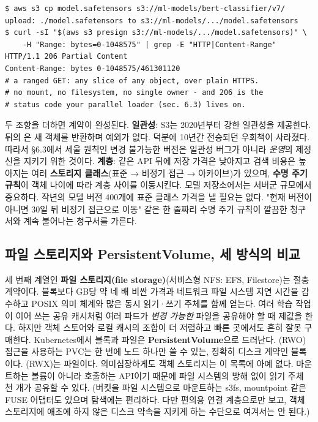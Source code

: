 \begin{terminalbox}
\begin{Verbatim}[breaklines=true,breakanywhere=true,fontsize=\small,formatcom=\color{tbbtermfg},codes=\tbbcodeactive]
$ aws s3 cp model.safetensors s3://ml-models/bert-classifier/v7/
upload: ./model.safetensors to s3://ml-models/.../model.safetensors
$ curl -sI "$(aws s3 presign s3://ml-models/.../model.safetensors)" \
    -H "Range: bytes=0-1048575" | grep -E "HTTP|Content-Range"
HTTP/1.1 206 Partial Content
Content-Range: bytes 0-1048575/461301120
# a ranged GET: any slice of any object, over plain HTTPS.
# no mount, no filesystem, no single owner - and 206 is the
# status code your parallel loader (sec. 6.3) lives on.
\end{Verbatim}
\end{terminalbox}

두 조항을 더하면 계약이 완성된다. \textbf{일관성}: S3는 2020년부터 강한 일관성을 제공한다.  뒤의 은 새 객체를 반환하며 예외가 없다. 덕분에 10년간 전승되던 우회책이 사라졌다. 따라서 §6.3에서 세울 원칙인 변경 불가능한 버전은 일관성 버그가 아니라 \textit{운영}의 제정신을 지키기 위한 것이다. \textbf{계층}: 같은 API 뒤에 저장 가격은 낮아지고 검색 비용은 높아지는 여러 \textbf{스토리지 클래스}(표준 → 비정기 접근 → 아카이브)가 있으며, \textbf{수명 주기 규칙}이 객체 나이에 따라 계층 사이를 이동시킨다. 모델 저장소에서는 서버군 규모에서 중요하다. 작년의 모델 버전 400개에 표준 클래스 가격을 낼 필요는 없다. "현재 버전이 아니면 30일 뒤 비정기 접근으로 이동" 같은 한 줄짜리 수명 주기 규칙이 깔끔한 청구서와 계속 불어나는 청구서를 가른다.

\subsection*{파일 스토리지와 PersistentVolume, 세 방식의 비교}

세 번째 계열인 \textbf{파일 스토리지(file storage)}(서비스형 NFS: EFS, Filestore)는 절충 계약이다. 블록보다 GB당 약 네 배 비싼 가격과 네트워크 파일 시스템 지연 시간을 감수하고 POSIX 의미 체계와 많은 동시 읽기·쓰기 주체를 함께 얻는다. 여러 학습 작업이 이어 쓰는 공유 캐시처럼 여러 파드가 \textit{변경 가능한} 파일을 공유해야 할 때 제값을 한다. 하지만 객체 스토어와 로컬 캐시의 조합이 더 저렴하고 빠른 곳에서도 흔히 잘못 구매한다. Kubernetes에서 블록과 파일은 \textbf{PersistentVolume}으로 드러난다. (RWO) 접근을 사용하는 PVC는 한 번에 노드 하나만 쓸 수 있는, 정확히 디스크 계약인 블록이다. (RWX)는 파일이다. 의미심장하게도 객체 스토리지는 이 목록에 아예 없다. 마운트하는 볼륨이 아니라 호출하는 API이기 때문에 파일 시스템의 방해 없이 읽기 주체 천 개가 공유할 수 있다. (버킷을 파일 시스템으로 마운트하는 s3fs, mountpoint 같은 FUSE 어댑터도 있으며 탐색에는 편리하다. 다만 편의용 연결 계층으로만 보고, 객체 스토리지에 애초에 하지 않은 디스크 약속을 지키게 하는 수단으로 여겨서는 안 된다.)

